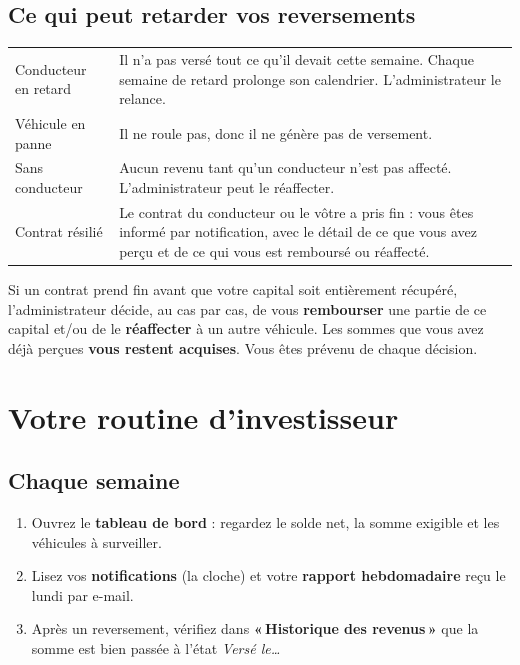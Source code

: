 \documentclass[11pt,a4paper]{article}
\newcommand{\Needspace}[1]{\par\ifdim\pagegoal<\maxdimen\ifdim\dimexpr\pagegoal-\pagetotal\relax<#1\relax\newpage\fi\fi}
\newcommand{\bouton}[1]{\textbf{«\,#1\,»}}
\let\oldsubsection\subsection
\renewcommand{\subsection}{\Needspace{5.5cm}\oldsubsection}
\let\oldsection\section
\renewcommand{\section}{\clearpage\oldsection}
\begin{document}
\subsection{Ce qui peut retarder vos reversements}

\begin{center}
\begin{tabularx}{\linewidth}{@{}L{3.6cm}X@{}}
\toprule
Conducteur en retard & Il n'a pas versé tout ce qu'il devait cette semaine. Chaque semaine de retard prolonge son calendrier. L'administrateur le relance.\\
Véhicule en panne & Il ne roule pas, donc il ne génère pas de versement.\\
Sans conducteur & Aucun revenu tant qu'un conducteur n'est pas affecté. L'administrateur peut le réaffecter.\\
Contrat résilié & Le contrat du conducteur ou le vôtre a pris fin : vous êtes informé par notification, avec le détail de ce que vous avez perçu et de ce qui vous est remboursé ou réaffecté.\\
\bottomrule
\end{tabularx}
\end{center}

\begin{retenir}
Si un contrat prend fin avant que votre capital soit entièrement récupéré, l'administrateur décide, au cas par cas, de vous \textbf{rembourser} une partie de ce capital et/ou de le \textbf{réaffecter} à un autre véhicule. Les sommes que vous avez déjà perçues \textbf{vous restent acquises}. Vous êtes prévenu de chaque décision.
\end{retenir}

\section{Votre routine d'investisseur}

\subsection{Chaque semaine}
\begin{enumerate}
  \item Ouvrez le \textbf{tableau de bord} : regardez le solde net, la somme exigible et les véhicules à surveiller.
  \item Lisez vos \textbf{notifications} (la cloche) et votre \textbf{rapport hebdomadaire} reçu le lundi par e-mail.
  \item Après un reversement, vérifiez dans \bouton{Historique des revenus} que la somme est bien passée à l'état \textit{Versé le\ldots}
\end{enumerate}
\end{document}
